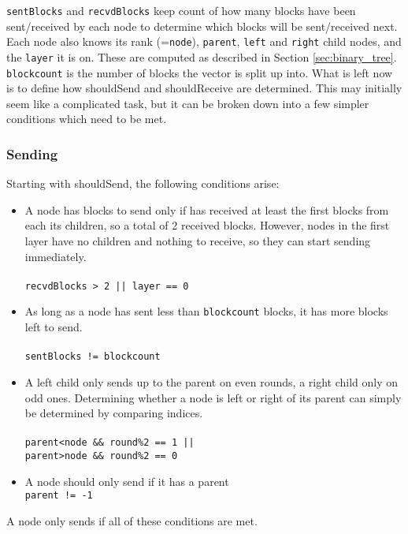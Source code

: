 \documentclass[twoside,twocolumn,hidelinks]{article}
\begin{document}
\texttt{sentBlocks} and \texttt{recvdBlocks} keep count of how many blocks have been sent/received by each node to determine which blocks will be sent/received next. Each node also knows its rank (=\texttt{node}), \texttt{parent}, \texttt{left} and \texttt{right} child nodes, and the \texttt{layer} it is on. These are computed as described in Section \ref{sec:binary_tree}. \texttt{blockcount} is the number of blocks the  vector is split up into. What is left now is to define how shouldSend and shouldReceive are determined. This may initially seem like a complicated task, but it can be broken down into a few simpler conditions which need to be met. 

\subsubsection{Sending}
Starting with shouldSend, the following conditions arise:

\begin{itemize}
      \item A node has blocks to send only if has received at least the first blocks from each its children, so a total of 2 received blocks. However, nodes in the first layer have no children and nothing to receive, so they can start sending immediately.\\\\
      \texttt{recvdBlocks > 2 || layer == 0}\\
      \item As long as a node has sent less than \texttt{blockcount} blocks, it has more blocks left to send. \\\\
      \texttt{sentBlocks != blockcount}\\
      \item A left child only sends up to the parent on even rounds, a right child only on odd ones. Determining whether a node is left or right of its parent can simply be determined by comparing indices. \\\\
      \texttt{parent<node \&\& round\%2 == 1 ||} \\
      \texttt{parent>node \&\& round\%2 == 0}\\
      \item A node should only send if it has a parent \\
      \texttt{parent != -1}
\end{itemize}

A node only sends if all of these conditions are met. 
\end{document}
